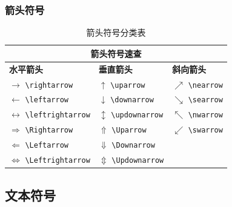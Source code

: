 \documentclass{article}
\begin{document}
\subsubsection{箭头符号}
\renewcommand{\arraystretch}{1.5}
\begin{table}[H]
      \centering
      \begin{tabular}{@{}lll@{}}
            \toprule
            \multicolumn{3}{c}{\textbf{箭头符号速查}}                                                                        \\
            \midrule
            \textbf{水平箭头}                            & \textbf{垂直箭头}                      & \textbf{斜向箭头}              \\
            \midrule
            $\rightarrow$ \verb|\rightarrow|         & $\uparrow$ \verb|\uparrow|         & $\nearrow$ \verb|\nearrow| \\
            $\leftarrow$ \verb|\leftarrow|           & $\downarrow$ \verb|\downarrow|     & $\searrow$ \verb|\searrow| \\
            $\leftrightarrow$ \verb|\leftrightarrow| & $\updownarrow$ \verb|\updownarrow| & $\nwarrow$ \verb|\nwarrow| \\
            $\Rightarrow$ \verb|\Rightarrow|         & $\Uparrow$ \verb|\Uparrow|         & $\swarrow$ \verb|\swarrow| \\
            $\Leftarrow$ \verb|\Leftarrow|           & $\Downarrow$ \verb|\Downarrow|     &                            \\
            $\Leftrightarrow$ \verb|\Leftrightarrow| & $\Updownarrow$ \verb|\Updownarrow| &                            \\
            \bottomrule
      \end{tabular}
      \caption{箭头符号分类表}
\end{table}
\renewcommand{\arraystretch}{1}

\subsection{文本符号}
\end{document}
